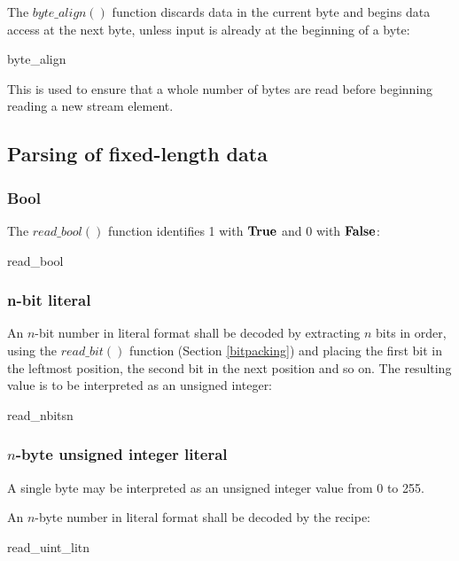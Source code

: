 The $byte\_align()$ function discards data in the current byte and begins data access
at the next byte, unless input is already at the beginning of a byte: 

\begin{pseudo}{byte\_align}{}
\bsEND
\end{pseudo}

This is used to ensure that a whole number of bytes are read before
beginning reading a new stream element.

\subsection{Parsing of fixed-length data}
\subsubsection{Bool}

The $read\_bool()$ function identifies 1 with $\text{\bf{True}}$ and 0 with $\text{\bf{False}}$:

\begin{pseudo}{read\_bool}{}
    \bsRET{\true}
\bsELSE
    \bsRET{\false}
\bsEND
\end{pseudo}

\subsubsection{n-bit literal}
An $n$-bit number in literal format shall be decoded by extracting $n$ bits
in order, using the $read\_bit()$ function (Section \ref{bitpacking})
 and placing the first bit in the leftmost position, the second
bit in the next position and so on. The resulting value is to be
interpreted as an unsigned integer:

\begin{pseudo}{read\_nbits}{n}
\bsEND
{}
\end{pseudo}

\subsubsection{$n$-byte unsigned integer literal}
A single byte may be interpreted as an unsigned integer value from 0 to 255.

An $n$-byte number in literal format shall be decoded by the recipe:

\begin{pseudo}{read\_uint\_lit}{n}
\bsEND
{}
\end{pseudo}

